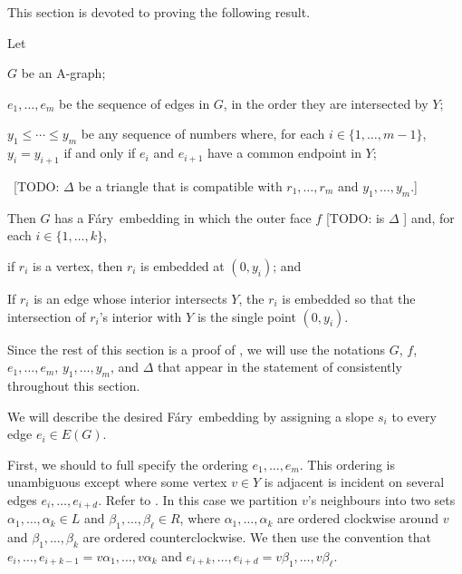 \documentclass{patmorin}
\newcommand{\Fary}{Fáry}
\begin{document}
This section is devoted to proving the following result.

\begin{thm}
   Let
   \begin{compactenum}
     \item $G$ be an A-graph;
     \item $e_1,\ldots,e_m$ be the sequence of edges in $G$,
           in the order they are intersected by $Y$;
     \item $y_1\le\cdots\le y_m$ be any sequence of numbers where, for
           each $i\in\{1,\ldots,m-1\}$, $y_i=y_{i+1}$ if and only if $e_i$
           and $e_{i+1}$ have a common endpoint in $Y$;
     \item \ [TODO: $\Delta$ be a triangle that is compatible with 
           $r_1,\ldots,r_m$ and $y_1,\ldots,y_m$.]
  \end{compactenum}
   Then $G$ has a
   \Fary\ embedding in which the outer face $f$ [TODO: is $\Delta$ ]
   and, for each $i\in\{1,\ldots,k\}$, 
   \begin{compactenum}
       \item if $r_i$ is a vertex, then $r_i$ is embedded at $(0,y_i)$; and 
       \item If $r_i$ is an edge whose interior intersects $Y$, the $r_i$
         is embedded so that the intersection of $r_i$'s interior with
         $Y$ is the single point $(0,y_i)$.
   \end{compactenum}
\end{thm}

Since the rest of this section is a proof of ,
we will use the notations $G$, $f$, $e_1,\ldots,e_m$, $y_1,\ldots,y_m$,
and $\Delta$ that appear in the statement of  consistently
throughout this section.

We will describe the desired \Fary\ embedding by assigning a slope
$s_i$ to every edge $e_i\in E(G)$.  


First, we should to full specify
the ordering $e_1,\ldots,e_m$. This ordering is unambiguous except
where some vertex $v\in Y$ is adjacent is incident on several edges
$e_{i},\ldots,e_{i+d}$.  Refer to .
In this case we partition $v$'s neighbours
into two sets $\alpha_1,\ldots,\alpha_k\in L$ and $\beta_1,\ldots,\beta_\ell\in
R$, where $\alpha_1,\ldots,\alpha_k$ are ordered clockwise around $v$
and $\beta_1,\ldots,\beta_k$ are ordered counterclockwise.  We then use
the convention that $e_i,\ldots,e_{i+k-1}=v\alpha_1,\ldots,v\alpha_k$ and
$e_{i+k},\ldots,e_{i+d}=v\beta_1,\ldots,v\beta_\ell$.
\end{document}
